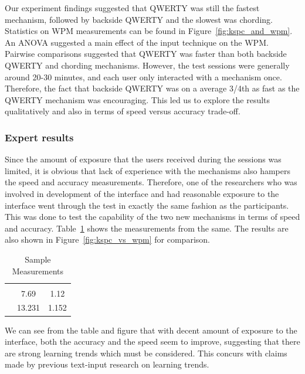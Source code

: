 Our experiment findings suggested that QWERTY was still the fastest
mechanism, followed by backside QWERTY and the slowest was
chording. Statistics on WPM measurements can be found in
Figure~\ref{fig:kspc_and_wpm}. An ANOVA suggested a main effect of the input technique on the WPM. Pairwise comparisons suggested that QWERTY was faster than both backside QWERTY
and chording mechanisms. However, the test sessions were generally around 20-30 minutes, and each user only interacted with a mechanism once. Therefore, the fact that backside
QWERTY was on a average 3/4th as fast as the QWERTY mechanism was
encouraging. This led us to explore the results qualitatively and also
in terms of speed versus accuracy trade-off.


\subsubsection{Expert results}

Since the amount of exposure that the users received during the sessions was limited, it is obvious that lack of experience with the mechanisms also hampers the speed and accuracy measurements. Therefore, one of the researchers who was involved in development of the interface and had reasonable exposure to the interface went through the test in exactly the same fashion as the participants. This was done to test the capability of the two new mechanisms in terms of speed and accuracy. Table~\ref{tab:StatisticsForTestCorpora} shows the measurements from the same.  The results are also shown in Figure~\ref{fig:kspc_vs_wpm} for comparison.

\begin{table}
	\centering
		\begin{tabular}{rcc} 
		                         & \color{grey}{WPM}    & \color{grey}{KSPC} \\ 
                   \color{grey}{Chording} & 7.69   & 1.12 \\ 
                   \color{grey}{Backside QWERTY} & 13.231 & 1.152 \\ 
		\end{tabular}
	\caption{Sample Measurements}
	\label{tab:StatisticsForTestCorpora}
\end{table}

We can see from the table and figure that with decent amount of
exposure to the interface, both the accuracy and the speed seem to
improve, suggesting that there are strong learning trends which must
be considered. This concurs with claims made by previous text-input research on learning trends. \cite{LetterWise} 

